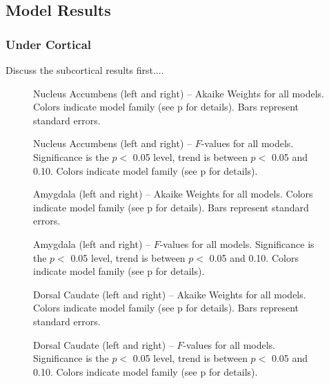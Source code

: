 \documentclass[doc,12pt]{apa}        %
\begin{document}
\subsection{Model Results}
\label{sub:modelresults}
\subsubsection{Under Cortical}
\label{subsub:belowctx}
Discuss the subcortical results first....

\begin{figure}[tp]
    \centering
    \caption{Nucleus Accumbens (left and right) -- Akaike Weights for all models.  Colors indicate model family (see p\pageref{sub:cmb} for details). Bars represent standard errors.}
	\label{fig:accumbens}
\end{figure}
\begin{figure}[tp]
    \centering
    \caption{Nucleus Accumbens (left and right) -- $F$-values for all models.  Significance is the $p <$ 0.05 level, trend is between $p <$ 0.05 and 0.10.  Colors indicate model family (see p\pageref{sub:cmb} for details).}
	\label{fig:fvalaccumbens}
\end{figure}


\begin{figure}[tp]
    \centering
    \caption{Amygdala (left and right) -- Akaike Weights for all models.  Colors indicate model family (see p\pageref{sub:cmb} for details). Bars represent standard errors.}
	\label{fig:amygdala}
\end{figure}
\begin{figure}[tp]
    \centering
    \caption{Amygdala (left and right) -- $F$-values for all models.  Significance is the $p <$ 0.05 level, trend is between $p <$ 0.05 and 0.10.  Colors indicate model family (see p\pageref{sub:cmb} for details).}
	\label{fig:fvalamygdala}
\end{figure}


\begin{figure}[tp]
    \centering
    \caption{Dorsal Caudate (left and right) -- Akaike Weights for all models.  Colors indicate model family (see p\pageref{sub:cmb} for details). Bars represent standard errors.}
	\label{fig:caudate}
\end{figure}
\begin{figure}[tp]
    \centering
    \caption{Dorsal Caudate (left and right) -- $F$-values for all models.  Significance is the $p <$ 0.05 level, trend is between $p <$ 0.05 and 0.10.  Colors indicate model family (see p\pageref{sub:cmb} for details).}
	\label{fig:fvalcaudate}
\end{figure}
\end{document}
